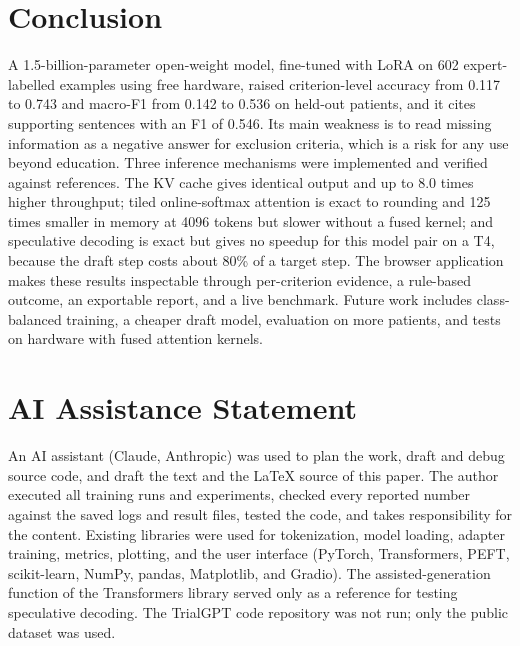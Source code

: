 \documentclass[conference]{IEEEtran}
\begin{document}
\section{Conclusion}\label{sec:conclusion}
A 1.5-billion-parameter open-weight model, fine-tuned with LoRA on 602 expert-labelled examples using free hardware, raised criterion-level accuracy from 0.117 to 0.743 and macro-F1 from 0.142 to 0.536 on held-out patients, and it cites supporting sentences with an F1 of 0.546. Its main weakness is to read missing information as a negative answer for exclusion criteria, which is a risk for any use beyond education. Three inference mechanisms were implemented and verified against references. The KV cache gives identical output and up to 8.0 times higher throughput; tiled online-softmax attention is exact to rounding and 125 times smaller in memory at 4096 tokens but slower without a fused kernel; and speculative decoding is exact but gives no speedup for this model pair on a T4, because the draft step costs about 80\% of a target step. The browser application makes these results inspectable through per-criterion evidence, a rule-based outcome, an exportable report, and a live benchmark. Future work includes class-balanced training, a cheaper draft model, evaluation on more patients, and tests on hardware with fused attention kernels.

\appendices
\section{AI Assistance Statement}
An AI assistant (Claude, Anthropic) was used to plan the work, draft and debug source code, and draft the text and the \LaTeX{} source of this paper. The author executed all training runs and experiments, checked every reported number against the saved logs and result files, tested the code, and takes responsibility for the content. Existing libraries were used for tokenization, model loading, adapter training, metrics, plotting, and the user interface (PyTorch, Transformers, PEFT, scikit-learn, NumPy, pandas, Matplotlib, and Gradio). The assisted-generation function of the Transformers library served only as a reference for testing speculative decoding. The TrialGPT code repository was not run; only the public dataset was used.



\end{document}

